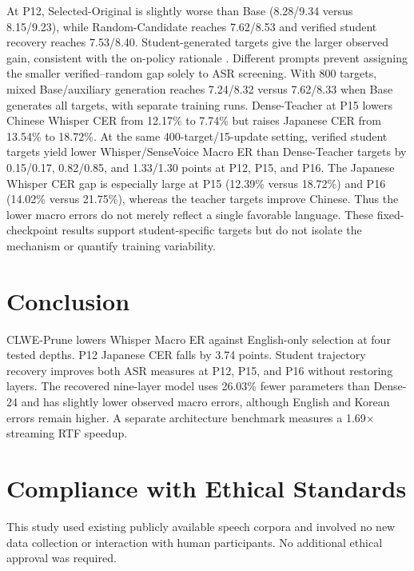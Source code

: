 \documentclass{article}
\begin{document}
At P12, Selected-Original is slightly worse than Base (8.28/9.34
versus 8.15/9.23), while Random-Candidate reaches 7.62/8.53 and
verified student recovery reaches 7.53/8.40. Student-generated targets
give the larger observed gain, consistent with the on-policy rationale
\cite{agarwal2024onpolicy}. Different prompts prevent assigning the
smaller verified--random gap solely to ASR screening.
With 800 targets, mixed Base/auxiliary generation reaches 7.24/8.32
versus 7.62/8.33 when Base generates all targets, with separate
training runs. Dense-Teacher at P15 lowers Chinese Whisper CER from
12.17\% to 7.74\% but raises Japanese CER from 13.54\% to 18.72\%.
At the same 400-target/15-update setting, verified student targets
yield lower Whisper/SenseVoice Macro ER than Dense-Teacher targets by
0.15/0.17, 0.82/0.85, and 1.33/1.30 points at P12, P15, and P16.
The Japanese Whisper CER gap is especially large at P15 (12.39\%
versus 18.72\%) and P16 (14.02\% versus 21.75\%), whereas the
teacher targets improve Chinese. Thus the lower macro errors do not
merely reflect a single favorable language. These fixed-checkpoint
results support student-specific targets but do not isolate the
mechanism or quantify training variability.

\section{Conclusion}
\label{sec:conclusion}

CLWE-Prune lowers Whisper Macro ER against English-only selection at
four tested depths. P12 Japanese CER falls by 3.74 points. Student
trajectory recovery improves both ASR measures at P12, P15, and P16
without restoring layers. The recovered nine-layer model uses 26.03\%
fewer parameters than Dense-24 and has slightly lower observed macro
errors, although English and Korean errors remain higher. A separate
architecture benchmark measures a 1.69$\times$ streaming RTF speedup.

\section{Compliance with Ethical Standards}
This study used existing publicly available speech corpora and
involved no new data collection or interaction with human
participants. No additional ethical approval was required.







\begingroup\small

\endgroup
\end{document}
